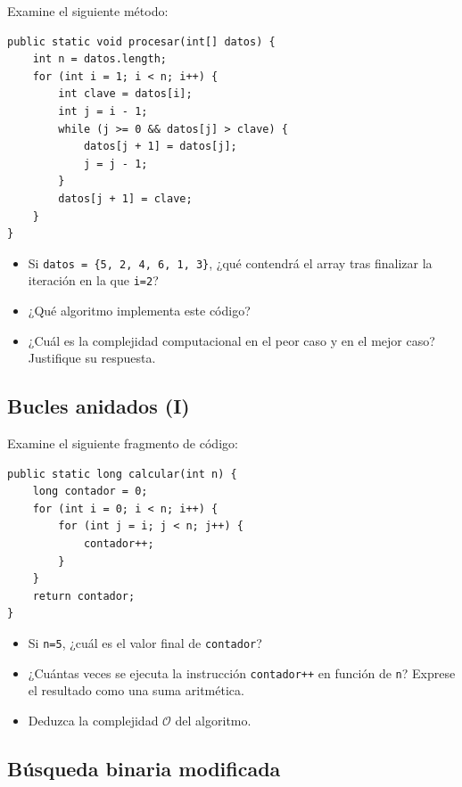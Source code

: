 \documentclass[a4paper]{article}
\newcommand{\code}[1]{\texttt{#1}}
\newcommand{\bigO}{\mathcal{O}}
\begin{document}
Examine el siguiente método:

\begin{verbatim}
public static void procesar(int[] datos) {
    int n = datos.length;
    for (int i = 1; i < n; i++) {
        int clave = datos[i];
        int j = i - 1;
        while (j >= 0 && datos[j] > clave) {
            datos[j + 1] = datos[j];
            j = j - 1;
        }
        datos[j + 1] = clave;
    }
}
\end{verbatim}

\begin{itemize}
    \item Si \code{datos = \{5, 2, 4, 6, 1, 3\}}, ¿qué contendrá el array tras finalizar la iteración en la que \code{i=2}?
    \item ¿Qué algoritmo implementa este código?
    \item ¿Cuál es la complejidad computacional en el peor caso y en el mejor caso? Justifique su respuesta.
\end{itemize}

\subsection{Bucles anidados (I)}

Examine el siguiente fragmento de código:

\begin{verbatim}
public static long calcular(int n) {
    long contador = 0;
    for (int i = 0; i < n; i++) {
        for (int j = i; j < n; j++) {
            contador++;
        }
    }
    return contador;
}
\end{verbatim}

\begin{itemize}
    \item Si \code{n=5}, ¿cuál es el valor final de \code{contador}?
    \item ¿Cuántas veces se ejecuta la instrucción \code{contador++} en función de \code{n}? Exprese el resultado como una suma aritmética.
    \item Deduzca la complejidad $\bigO$ del algoritmo.
\end{itemize}

\subsection{Búsqueda binaria modificada}
\end{document}
